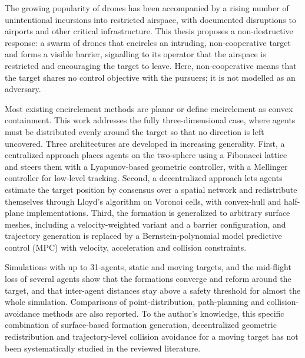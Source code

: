 
%

The growing popularity of drones has been accompanied by a rising number of
unintentional incursions into restricted airspace, with documented
disruptions to airports and other critical infrastructure. This thesis
proposes a non-destructive response: a swarm of drones that encircles an
intruding, non-cooperative target and forms a visible barrier, signalling
to its operator that the airspace is restricted and encouraging the target
to leave. Here, non-cooperative means that the target shares no
control objective with the pursuers; it is not modelled as an adversary.
 
Most existing encirclement methods are planar or define encirclement as
convex containment. This work addresses the fully three-dimensional case,
where agents must be distributed evenly around the target so that no
direction is left uncovered. Three architectures are developed in
increasing generality. First, a centralized approach places agents on the
two-sphere using a Fibonacci lattice and steers them with a Lyapunov-based
geometric controller, with a Mellinger controller for low-level tracking.
Second, a decentralized approach lets agents estimate the target position
by consensus over a spatial network and redistribute themselves through
Lloyd's algorithm on Voronoi cells, with convex-hull and half-plane
implementations. Third, the formation is generalized to arbitrary surface
meshes, including a velocity-weighted variant and a barrier configuration,
and trajectory generation is replaced by a Bernstein-polynomial model
predictive control (MPC) with velocity, acceleration and collision
constraints.
 
Simulations with up to 31-agents, static and moving targets, and the
mid-flight loss of several agents show that the formations converge and
reform around the target, and that inter-agent distances stay above a
safety threshold for almost the whole simulation. Comparisons of
point-distribution, path-planning and collision-avoidance methods are also
reported. To the author's knowledge, this specific combination of
surface-based formation generation, decentralized geometric redistribution
and trajectory-level collision avoidance for a moving target has not been
systematically studied in the reviewed literature.


